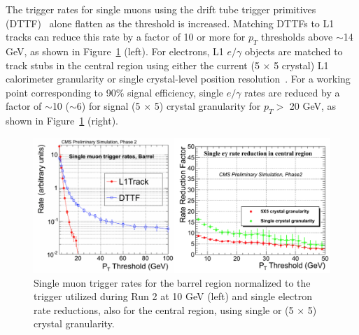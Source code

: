 \documentclass{PoS}
\begin{document}
The trigger rates for single muons using the drift tube trigger primitives (DTTF)~\cite{DTTF} alone flatten as the threshold is increased. Matching DTTFs to L1 tracks can reduce this rate by a factor of 10 or more for $p_T$ thresholds above $\sim$14 GeV, as shown in Figure~\ref{fig:Rates} (left). For electrons, L1 $e/\gamma$ objects are matched to track stubs in the central region using either the current (5 $\times$ 5 crystal) L1 calorimeter granularity or single crystal-level position resolution~\cite{L1}. For a working point corresponding to 90\% signal efficiency, single $e/\gamma$ rates are reduced by a factor of $\sim$10 ($\sim$6) for signal (5 $\times$ 5) crystal granularity for $p_T > $ 20 GeV, as shown in Figure~\ref{fig:Rates} (right).
\begin{figure}[h!]
  \centering
	\includegraphics[width=\textwidth]{Figures/Rates.png}
	\caption{Single muon trigger rates for the barrel region normalized to the trigger utilized during Run 2 at 10 GeV (left) and single electron rate reductions, also for the central region, using single or (5 $\times$ 5) crystal granularity.}
	\label{fig:Rates}
\end{figure}
\end{document}
